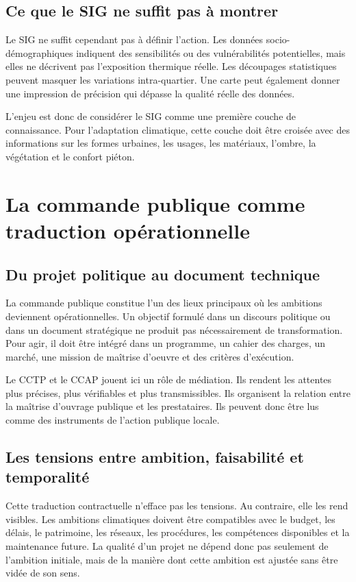 \documentclass[11pt,a4paper]{report}
\begin{document}
\subsection{Ce que le SIG ne suffit pas à montrer}

Le SIG ne suffit cependant pas à définir l'action. Les données socio-démographiques indiquent des sensibilités ou des vulnérabilités potentielles, mais elles ne décrivent pas l'exposition thermique réelle. Les découpages statistiques peuvent masquer les variations intra-quartier. Une carte peut également donner une impression de précision qui dépasse la qualité réelle des données.

L'enjeu est donc de considérer le SIG comme une première couche de connaissance. Pour l'adaptation climatique, cette couche doit être croisée avec des informations sur les formes urbaines, les usages, les matériaux, l'ombre, la végétation et le confort piéton.

\section{La commande publique comme traduction opérationnelle}

\subsection{Du projet politique au document technique}

La commande publique constitue l'un des lieux principaux où les ambitions deviennent opérationnelles. Un objectif formulé dans un discours politique ou dans un document stratégique ne produit pas nécessairement de transformation. Pour agir, il doit être intégré dans un programme, un cahier des charges, un marché, une mission de maîtrise d'oeuvre et des critères d'exécution.

Le CCTP et le CCAP jouent ici un rôle de médiation. Ils rendent les attentes plus précises, plus vérifiables et plus transmissibles. Ils organisent la relation entre la maîtrise d'ouvrage publique et les prestataires. Ils peuvent donc être lus comme des instruments de l'action publique locale.

\subsection{Les tensions entre ambition, faisabilité et temporalité}

Cette traduction contractuelle n'efface pas les tensions. Au contraire, elle les rend visibles. Les ambitions climatiques doivent être compatibles avec le budget, les délais, le patrimoine, les réseaux, les procédures, les compétences disponibles et la maintenance future. La qualité d'un projet ne dépend donc pas seulement de l'ambition initiale, mais de la manière dont cette ambition est ajustée sans être vidée de son sens.
\end{document}
